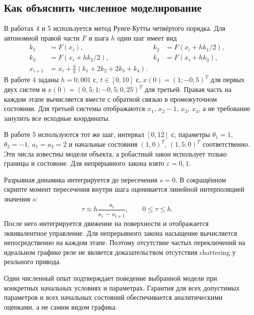 \subsection{Как объяснить численное моделирование}
\addition В работах 4 и 5 используется метод Рунге-Кутты четвёртого порядка.
Для автономной правой части $F$ и шага $h$ один шаг имеет вид
\[
 \begin{aligned}
 k_1&=F(x_i),& k_2&=F(x_i+hk_1/2),\\
 k_3&=F(x_i+hk_2/2),& k_4&=F(x_i+hk_3),\\
 x_{i+1}&=x_i+\frac h6(k_1+2k_2+2k_3+k_4).
 \end{aligned}
\]
В работе 4 заданы $h=0{,}001$ с, $t\in[0,10]$ с,
$x(0)=(1;-0{,}5)^T$ для первых двух систем и
$x(0)=(0{,}5;1;-0{,}5;0{,}25)^T$ для третьей.
Правая часть на каждом этапе вычисляется вместе с обратной связью
в промежуточном состоянии. Для третьей системы отображаются
$x_1$, $x_2-1$, $x_3$, $x_4$, а не требование занулить все исходные координаты.

В работе 5 используются тот же шаг, интервал $[0,12]$ с,
параметры $\theta_1=1$, $\theta_2=-1$, $a_1=a_2=2$ и начальные
состояния $(1,0)^T$, $(1{,}5;0)^T$ соответственно. Эти числа известны
модели объекта, а робастный закон использует только границы и состояние.
Для непрерывного закона взято $\varepsilon=0{,}1$.

Разрывная динамика интегрируется до пересечения $s=0$.
В сокращённом скрипте момент пересечения внутри шага оценивается линейной
интерполяцией значения $s$:
\[
 \tau\approx h\frac{s_i}{s_i-s_{i+1}},\qquad 0\le\tau\le h.
\]
После него интегрируется движение на поверхности и отображается
эквивалентное управление. Для непрерывного закона насыщение вычисляется
непосредственно на каждом этапе. Поэтому отсутствие частых переключений
на идеальном графике реле не является доказательством отсутствия chattering
у реального привода.

Один численный опыт подтверждает поведение выбранной модели при конкретных
начальных условиях и параметрах. Гарантия для всех допустимых параметров
и всех начальных состояний обеспечивается аналитическими оценками,
а не самим видом графика.
